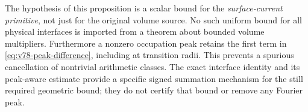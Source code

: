 The hypothesis of this proposition is a scalar bound for the
\emph{surface-current primitive}, not just for the original volume
source. No such uniform bound for all physical interfaces is imported
from a theorem about bounded volume multipliers. Furthermore a
nonzero occupation peak retains the first term in
\eqref{eq:v78-peak-difference}, including at transition radii. This
prevents a spurious cancellation of nontrivial arithmetic classes.
The exact interface identity and its peak-aware estimate provide a
specific signed summation mechanism for the still required geometric
bound; they do not certify that bound or remove any Fourier peak.

